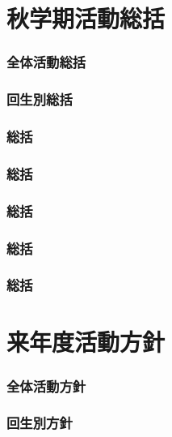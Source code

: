 \part{秋学期活動総括}
\section{全体活動総括}


\section{回生別総括}




\section{\kaikeiDepartment{}総括}

\section{\kensuiDepartment{}総括}

\section{\syogaiDepartment{}総括}

\section{\systemDepartment{}総括}

\section{\soumuDepartment{}総括}


\newpage
\part{来年度活動方針}
\section{全体活動方針}


\section{回生別方針}




